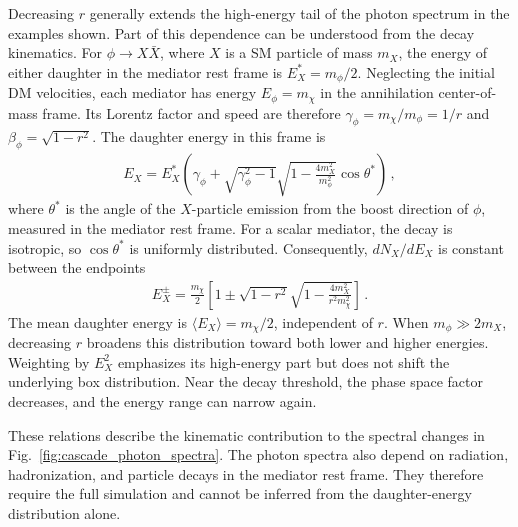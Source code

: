 \documentclass[superscriptaddress,
showpacs,preprintnumbers,nofootinbib,eqsecnum,amsmath,amssymb,aps,11pt, groupedaddress, floatfix]{revtex4-2}
\begin{document}
Decreasing $r$ generally extends the high-energy tail
of the photon spectrum in the examples shown.
Part of this dependence can be understood from the
decay kinematics.
For $\phi\to X \bar X$, where $X$ is a SM particle
of mass $m_X$, the energy of either daughter in the
mediator rest frame is $E_X^\ast=m_\phi/2$.
Neglecting the initial DM velocities, each mediator has
energy $E_\phi=m_\chi$ in the annihilation center-of-mass
frame.
Its Lorentz factor and speed are therefore
$\gamma_\phi=m_\chi/m_\phi=1/r$ and
$\beta_\phi=\sqrt{1-r^2}$.
The daughter energy in this frame is
\begin{align}
E_X = E_X^\ast \left( \gamma_\phi + \sqrt{\gamma_\phi^2 - 1} \sqrt{1 - \frac{4 m_X^2}{m_\phi^2}} \cos \theta^\ast \right)\,,
\end{align}
where $\theta^\ast$ is the angle of the $X$-particle emission from the boost direction of $\phi$, measured in the mediator rest frame. For a scalar mediator, the decay is isotropic, so $\cos\theta^\ast$ is uniformly distributed.
Consequently, $dN_X/dE_X$ is constant between the endpoints
\begin{align}
E_X^\pm
=
\frac{m_\chi}{2}
\left[
1\pm
\sqrt{1-r^2}
\sqrt{1-\frac{4m_X^2}{r^2m_\chi^2}}
\right]\,. 
\label{eq:Erange}
\end{align}
The mean daughter energy is
$\langle E_X\rangle=m_\chi/2$, independent of $r$.
When $m_\phi\gg2m_X$, decreasing $r$ broadens this distribution toward both lower and higher energies.
Weighting by $E_X^2$ emphasizes its high-energy part but does not shift the underlying box distribution.
Near the decay threshold, the phase space factor decreases, and the energy range can narrow again.

These relations describe the kinematic contribution to the spectral changes in
Fig.~\ref{fig:cascade_photon_spectra}.
The photon spectra also depend on radiation, hadronization, and particle decays in the mediator rest frame.
They therefore require the full simulation and cannot be inferred from the daughter-energy distribution alone.
\end{document}
